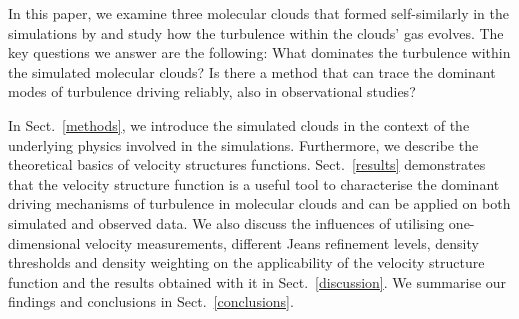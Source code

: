 In this paper, we examine three molecular clouds that formed self-similarly in the simulations by \citet[ and , hereafter]{IbanezMejia2016,IbanezMejia2017} and study how the turbulence within the clouds' gas evolves.
The key questions we answer are the following: 
What dominates the turbulence within the simulated molecular clouds? 
Is there a method that can trace the dominant modes of turbulence driving reliably, also in observational studies?

In Sect.~\ref{methods}, we introduce the simulated clouds in the context of the underlying physics involved in the simulations.
Furthermore, we describe the theoretical basics of velocity structures functions.
Sect.~\ref{results} demonstrates that the velocity structure function is a useful tool to characterise the dominant driving mechanisms of turbulence in molecular clouds and can be applied on both simulated and observed data. 
We also discuss the influences of utilising one-dimensional velocity measurements, different Jeans refinement levels, density thresholds and density weighting on the applicability of the velocity structure function and the results obtained with it in Sect.~\ref{discussion}.  
We summarise our findings and conclusions in Sect.~\ref{conclusions}.



\endinput
